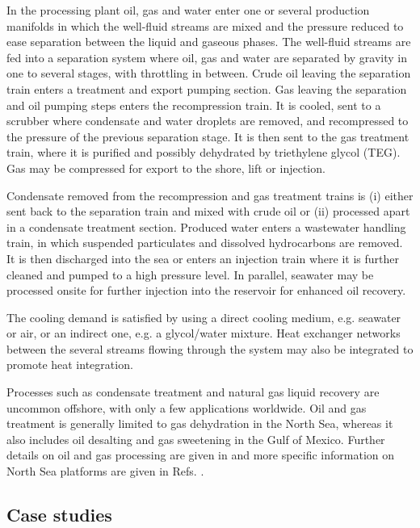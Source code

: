 In the processing plant oil, gas and water enter one or several production manifolds in which the well-fluid streams are mixed and the pressure reduced to ease separation between the liquid and gaseous phases. The well-fluid streams are fed into a separation system where oil, gas and water are separated by gravity in one to several stages, with throttling in between. Crude oil leaving the separation train enters a treatment and export pumping section. Gas leaving the separation and oil pumping steps enters the recompression train. It is cooled, sent to a scrubber where condensate and water droplets are removed, and recompressed to the pressure of the previous separation stage. It is then sent to the gas treatment train, where it is purified and possibly dehydrated by triethylene glycol (TEG). Gas may be compressed for export to the shore, lift or injection. 

Condensate removed from the recompression and gas treatment trains is (i) either sent back to the separation train and mixed with crude oil or (ii) processed apart in a condensate treatment section. Produced water enters a wastewater handling train, in which suspended particulates and dissolved hydrocarbons are removed. It is then discharged into the sea or enters an injection train where it is further cleaned and pumped to a high pressure level. In parallel, seawater may be processed onsite for further injection into the reservoir for enhanced oil recovery. 
	
The cooling demand is satisfied by using a direct cooling medium, e.g. seawater or air, or an indirect one, e.g. a glycol/water mixture. Heat exchanger networks between the several streams flowing through the system may also be integrated to promote heat integration.

Processes such as condensate treatment and natural gas liquid recovery are uncommon offshore, with only a few applications worldwide. Oil and gas treatment is generally limited to gas dehydration in the North Sea, whereas it also includes oil desalting and gas sweetening in the Gulf of Mexico. Further details on oil and gas processing are given in \cite{Manning1991a} and more specific information on North Sea platforms are given in Refs. \cite{Bothamley2004,Nguyen2013}.

\subsection{Case studies}
\label{subsec:specific}

